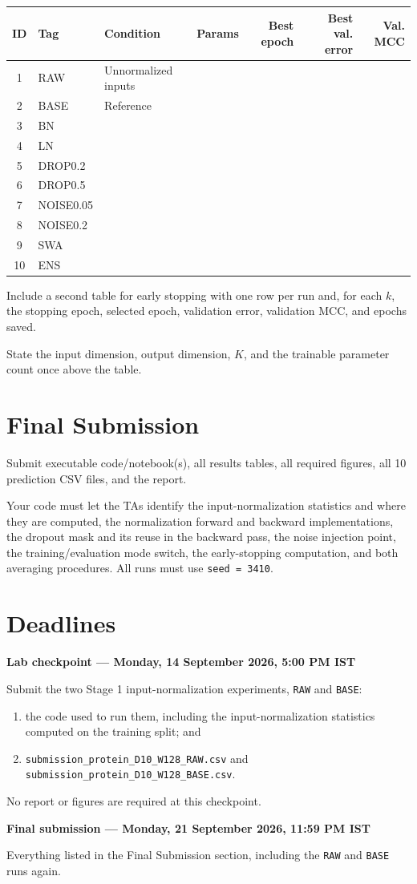 \documentclass[11pt]{article}
\newcommand{\stagedue}{Monday, 14 September 2026, 5:00 PM IST}
\newcommand{\finaldue}{Monday, 21 September 2026, 11:59 PM IST}
\begin{document}
\begin{center}
\small
\begin{tabular}{cllrrrr}
\toprule
ID & Tag & Condition & Params & Best epoch & Best val. error & Val. MCC \\
\midrule
1 & RAW        & Unnormalized inputs & & & & \\
2 & BASE       & Reference & & & & \\
3 & BN         & & & & & \\
4 & LN         & & & & & \\
5 & DROP0.2    & & & & & \\
6 & DROP0.5    & & & & & \\
7 & NOISE0.05  & & & & & \\
8 & NOISE0.2   & & & & & \\
\midrule
9  & SWA       & & & & & \\
10 & ENS       & & & & & \\
\bottomrule
\end{tabular}
\end{center}

Include a second table for early stopping with one row per run and, for each $k$, the stopping epoch, selected epoch, validation error, validation MCC, and epochs saved.

State the input dimension, output dimension, $K$, and the trainable parameter count once above the table.

\section{Final Submission}
Submit executable code/notebook(s), all results tables, all required figures, all 10 prediction CSV files, and the report.

Your code must let the TAs identify the input-normalization statistics and where they are computed, the normalization forward and backward implementations, the dropout mask and its reuse in the backward pass, the noise injection point, the training/evaluation mode switch, the early-stopping computation, and both averaging procedures. All runs must use \texttt{seed = 3410}.

\section{Deadlines}

\textbf{Lab checkpoint --- \stagedue}

Submit the two Stage 1 input-normalization experiments, \texttt{RAW} and \texttt{BASE}:
\begin{enumerate}
    \item the code used to run them, including the input-normalization statistics computed on the training split; and
    \item \texttt{submission\_protein\_D10\_W128\_RAW.csv} and \texttt{submission\_protein\_D10\_W128\_BASE.csv}.
\end{enumerate}
No report or figures are required at this checkpoint.

\textbf{Final submission --- \finaldue}

Everything listed in the Final Submission section, including the \texttt{RAW} and \texttt{BASE} runs again.
\end{document}
